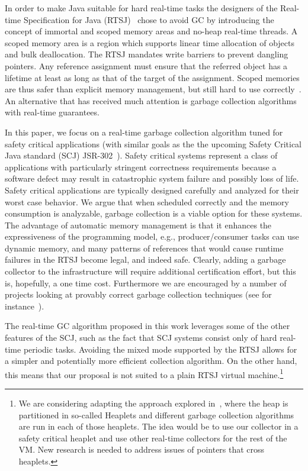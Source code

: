 In order to make Java suitable for hard real-time tasks the
designers of the Real-time Specification for Java (RTSJ)~\cite{rtsj}
chose to avoid GC by introducing the concept of immortal and scoped
memory areas and no-heap real-time threads.  A scoped memory area is
a region which supports linear time allocation of objects and bulk
deallocation. The RTSJ mandates write barriers to prevent dangling
pointers. Any reference assignment must ensure that the referred
object has a lifetime at least as long as that of the target of the
assignment. Scoped memories are thus safer than explicit memory
management, but still hard to use
correctly~\cite{conf/isorc/PizloFHV04}. An alternative that has
received much attention is garbage collection algorithms with
real-time guarantees.

In this paper, we focus on a real-time garbage collection algorithm
tuned for safety critical applications (with similar goals as the
the upcoming Safety Critical Java standard (SCJ)
JSR-302~\cite{jsr302}). Safety critical systems represent a class of
applications with particularly stringent correctness requirements
because a software defect may result in catastrophic system failure
and possibly loss of life.  Safety critical applications are
typically designed carefully and analyzed for their worst case
behavior.  We argue that when scheduled correctly and the memory
consumption is analyzable, garbage collection is a viable option for
these systems. The advantage of automatic memory management is that
it enhances the expressiveness of the programming model, e.g.,
producer/consumer tasks can use dynamic memory, and many patterns of
references that would cause runtime failures in the RTSJ become
legal, and indeed safe. Clearly, adding a garbage collector to the
infrastructure will require additional certification effort, but
this is, hopefully, a one time cost. Furthermore we are encouraged
by a number of projects looking at provably correct garbage
collection techniques (see for instance~\cite{h,v}).

The real-time GC algorithm proposed in this work leverages some of the other
features of the SCJ, such as the fact that SCJ systems consist only of hard
real-time periodic tasks. Avoiding the mixed mode supported by the RTSJ
allows for a simpler and potentially more efficient collection algorithm.
On the other hand, this means that our proposal is not suited to a plain
RTSJ virtual machine.\footnote{We are considering adapting the approach
explored in~\cite{1254784}, where the heap is partitioned in so-called
Heaplets and different garbage collection algorithms are run in each of
those heaplets. The idea would be to use our collector in a safety critical
heaplet and use other real-time collectors for the rest of the VM. New
research is needed to address issues of  pointers that cross heaplets.}

